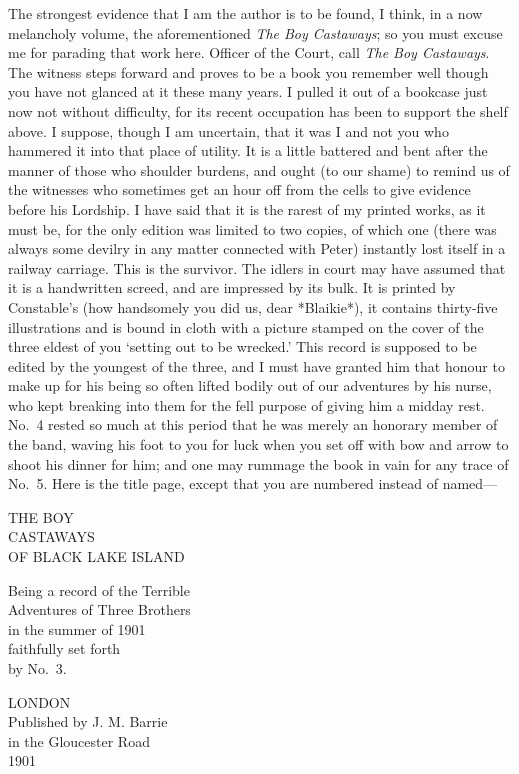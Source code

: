 The strongest evidence that I am the author is to be found, I think,
in a now melancholy volume, the aforementioned \emph{The Boy Castaways};
so you must excuse me for parading that work here.
Officer of the Court, call \emph{The Boy Castaways}.
The witness steps forward and proves to be a book you remember well
though you have not glanced at it these many years.
I pulled it out of a bookcase just now not without difficulty,
for its recent occupation has been to support the shelf above.
I suppose, though I am uncertain,
that it was I and not you who hammered it into that place of utility.
It is a little battered and bent after the manner of those who shoulder burdens,
and ought (to our shame) to remind us of the witnesses
who sometimes get an hour off from the cells to give evidence before his Lordship.
I have said that it is the rarest of my printed works, as it must be,
for the only edition was limited to two copies, of which one
(there was always some devilry in any matter connected with Peter)
instantly lost itself in a railway carriage.
This is the survivor.
The idlers in court may have assumed that it is a handwritten screed, and are impressed by its bulk.
It is printed by Constable’s
(how handsomely you did us, dear *Blaikie*),
it contains thirty‐five illustrations
and is bound in cloth with a picture stamped on the cover
of the three eldest of you ‘setting out to be wrecked.’
This record is supposed to be edited by the youngest of the three,
and I must have granted him that honour
to make up for his being so often lifted bodily out of our adventures by his nurse,
who kept breaking into them for the fell purpose of giving him a midday rest.
No.~4 rested so much at this period that he was merely an honorary member of the band,
waving his foot to you for luck when you set off with bow and arrow to shoot his dinner for him;
and one may rummage the book in vain for any trace of No.~5.
Here is the title page, except that you are numbered instead of named—

\begin{center}
\begin{samepage}
	\uppercase{The Boy\\Castaways\\of Black Lake Island}

	Being a record of the Terrible\\
	Adventures of Three Brothers\\
	in the summer of 1901\\
	faithfully set forth\\by No.~3.

	LONDON\\[\baselineskip]

	Published by J. M. Barrie\\
	in the Gloucester Road\\
	1901
\end{samepage}
\end{center}

